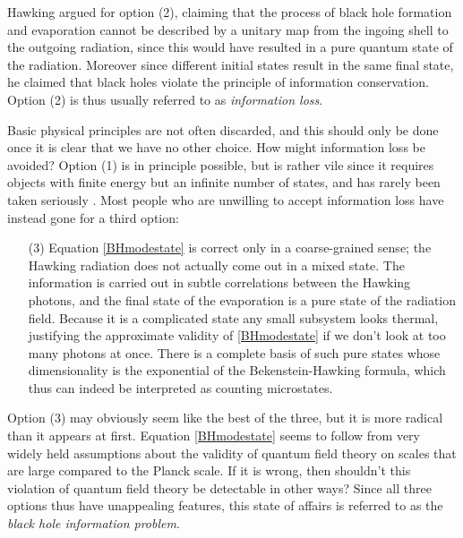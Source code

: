 \documentclass[12pt]{article}
\begin{document}
Hawking argued for option (2), claiming that the process of black hole formation and evaporation cannot be described by a unitary map from the ingoing shell to the outgoing radiation, since this would have resulted in a pure quantum state of the radiation.  Moreover since different initial states result in the same final state, he claimed that black holes violate the principle of information conservation.  Option (2) is thus usually referred to as \textit{information loss}.   

Basic physical principles are not often discarded, and this should only be done once it is clear that we have no other choice.  How might information loss be avoided?  Option (1) is in principle possible, but is rather vile since it requires objects with finite energy but an infinite number of states, and has rarely been taken seriously \cite{Preskill:1992tc,Giddings:1994qt,Susskind:1995da}.  
  Most people who are unwilling to accept information loss have instead gone for a third option:
\begin{itemize}
\item[(3)] Equation \eqref{BHmodestate} is correct only in a coarse-grained sense; the Hawking radiation does not actually come out in a mixed state.  The information is carried out in subtle correlations between the Hawking photons, and the final state of the evaporation is a pure state of the radiation field.  Because it is a complicated state any small subsystem looks thermal, justifying the approximate validity of \eqref{BHmodestate} if we don't look at too many photons at once.  There is a complete basis of such pure states whose dimensionality is the exponential of the Bekenstein-Hawking formula, which thus can indeed be interpreted as counting microstates.
\end{itemize}
Option (3) may obviously seem like the best of the three, but it is more radical than it appears at first.  Equation \eqref{BHmodestate} seems to follow from very widely held assumptions about the validity of quantum field theory on scales that are large compared to the Planck scale.  If it is wrong, then shouldn't this violation of quantum field theory be detectable in other ways?  Since all three options thus have unappealing features, this state of affairs is referred to as the \textit{black hole information problem}.
\end{document}
